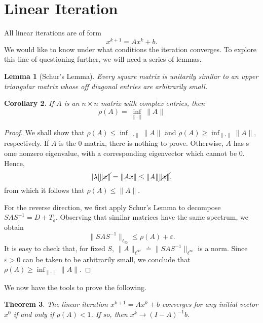 \documentclass[12pt,reqno]{amsart}
\numberwithin{equation}{section}  %
\newcommand{\ee}{\varepsilon}
\newtheorem{theorem}{Theorem}[section]
\newtheorem{lemma}[theorem]{Lemma}
\newtheorem{corollary}[theorem]{Corollary}
\begin{document}
\section{Linear Iteration}
All linear iterations are of form
\begin{equation*}
x^{k+1} = Ax^{k} + b.
\end{equation*}
We would like to know under what conditions the iteration converges. To explore
this line of questioning further, we will need a series of lemmas.
\begin{lemma}[Schur's Lemma]
Every square matrix is unitarily similar to an upper triangular matrix
whose off diagonal entries are arbitrarily small.
\end{lemma}
\begin{corollary}
\label{cor:spec}
If $A$ is an $n \times n$ matrix with complex entries, then 
\begin{equation*}
\rho(A) = \inf_{ \| \cdot \|} \| A \|
\end{equation*}
\end{corollary}
\begin{proof}
We shall show that $\rho(A) \le \inf_{ \| \cdot \|} \| A \|$ and $\rho(A) \ge
\inf_{ \| \cdot \|} \| A \|$, respectively. If $A$ is the $0$ matrix, there is
nothing to prove. Otherwise, $A$ has s
ome nonzero eigenvalue, with a corresponding eigenvector which cannot be $0$.
Hence,
\begin{equation*}
|\lambda| \cancel{\| x \|} = \| Ax \| \le \| A \| \cancel{\| x \|}.
\end{equation*}
from which it follows that $\rho(A) \le \| A \|$. 

For the reverse direction, we first apply Schur's Lemma to 
decompose $SAS^{-1} = D + T_{\ee}$. Observing that similar matrices have the same spectrum,
 we obtain 
\begin{equation*}
\| SAS^{-1} \|_{\ell_\infty} \le \rho(A) + \ee.
\end{equation*}
It is easy to check that, for fixed $S$,  $ \| A \|_{\ell^{\infty'}} \doteq \| S A S^{-1} \|_{\ell^\infty}$
is a norm. 
Since $\ee > 0$ can be taken to be arbitrarily small, we conclude that
$\rho(A) \ge
\inf_{ \| \cdot \|} \| A \|$.
\end{proof}
We now have the tools to prove the following.
\begin{theorem}
\label{thm:it}
The linear iteration $x^{k+1} = Ax^{k} + b$ converges for any initial
vector $x^{0}$ if and only if $\rho(A) < 1$. If so, then $x^{k} \to
(I-A)^{-1}b$.
\end{theorem}
\end{document}
